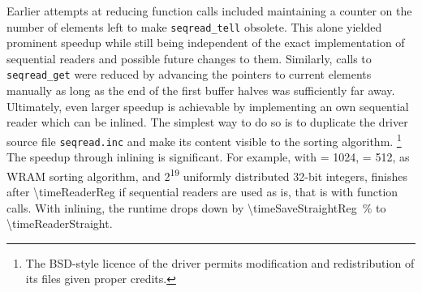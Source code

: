 Earlier attempts at reducing function calls included maintaining a counter on the number of elements left to make \lstinline|seqread_tell| obsolete.
This alone yielded prominent speedup while still being independent of the exact implementation of sequential readers and possible future changes to them.
Similarly, calls to \lstinline|seqread_get| were reduced by advancing the pointers to current elements manually as long as the end of the first buffer halves was sufficiently far away.
Ultimately, even larger speedup is achievable by implementing an own sequential reader which can be inlined.
The simplest way to do so is to duplicate the driver source file \lstinline|seqread.inc| and make its content visible to the sorting algorithm.%
\footnote{
	The BSD-style licence of the driver permits modification and redistribution of its files given proper credits.
}
The speedup through inlining is significant.
For example, with \cachesize{} = 1024, \seqreadcachesize{} = 512, \QS{} as \ac{WRAM} sorting algorithm, and 2\textsuperscript{19} uniformly distributed 32-bit integers, \MS{} finishes after \qty[exponent-mode=fixed, fixed-exponent=9, round-mode=places, round-precision=2]{\timeReaderReg}{\cycle} if sequential readers are used as is, that is with function calls.
With inlining, the runtime drops down by \qty[round-mode=places, round-precision=0]{\timeSaveStraightReg}{\percent} to \qty[exponent-mode=fixed, fixed-exponent=9, round-mode=places, round-precision=2]{\timeReaderStraight}{\cycle}.

